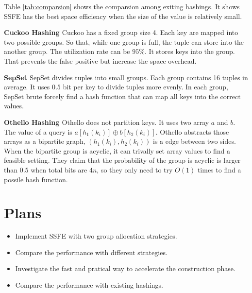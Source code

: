 \documentclass{article}
\begin{document}
Table \ref{tab:comparsion} shows the comparsion among exiting hashings. It shows SSFE has the best space efficiency when the size of the value is relatively small.

\textbf{Cuckoo Hashing \cite{zhou2013scalable}} Cuckoo has a fixed group size 4. Each key are mapped into two possible groups. So that, while one group is full, the tuple can store into the another group. The utilization rate can be $95\%$. It stores keys into the group. That prevents the false positive but increase the space overhead.

\textbf{SepSet \cite{zhou2015scaling}} SepSet divides tuples into small groups. Each group contains 16 tuples in average. It uses $0.5$ bit per key to divide tuples more evenly. In each group, SepSet brute forcely find a hash function that can map all keys into the correct values. 

\textbf{Othello Hashing \cite{yu2018memory}} Othello does not partition keys. It uses two array $a$ and $b$. The value of a query is $a[h_1(k_i)] \oplus b[h_2(k_i)]$. Othello abstracts those arrays as a bipartite graph, $(h_1(k_i), h_2(k_i))$ is a edge between two sides. When the bipartite group is acyclic, it can trivally set array values to find a feasible setting. They claim that the probability of the group is acyclic is larger than $0.5$ when total bits are $4n$, so they only need to try $O(1)$ times to find a possile hash function.

\section{Plans}

\begin{itemize}
    \item Implement SSFE with two group allocation strategies.
    \item Compare the performance with different strategies.
    \item Investigate the fast and pratical way to accelerate the construction phase.
    \item Compare the performance with existing hashings.
\end{itemize}



\end{document}
